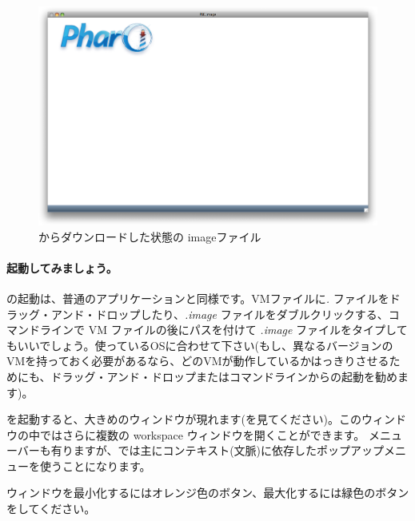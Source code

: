 \documentclass[a4paper,10pt,twoside]{book}
\begin{document}
\begin{figure}[htb]
\centerline {\includegraphics[width=\textwidth]{startup}}
\caption{\pbe からダウンロードした状態の imageファイル}
\end{figure}

\paragraph{起動してみましょう。} \pharo の起動は、普通のアプリケーションと同様です。VMファイルに\emph{.} ファイルをドラッグ・アンド・ドロップしたり、\emph{.image} ファイルをダブルクリックする、コマンドラインで VM ファイルの後にパスを付けて \emph{.image} ファイルをタイプしてもいいでしょう。使っているOSに合わせて下さい(もし、異なるバージョンのVMを持っておく必要があるなら、どのVMが動作しているかはっきりさせるためにも、ドラッグ・アンド・ドロップまたはコマンドラインからの起動を勧めます)。

\pharo を起動すると、大きめのウィンドウが現れます(を見てください)。このウィンドウの中ではさらに複数の workspace ウィンドウを開くことができます。
メニューバーも有りますが、\pharo では主にコンテキスト(文脈)に依存したポップアップメニューを使うことになります。


ウィンドウを最小化するにはオレンジ色のボタン、最大化するには緑色のボタンを\click してください。
\end{document}

